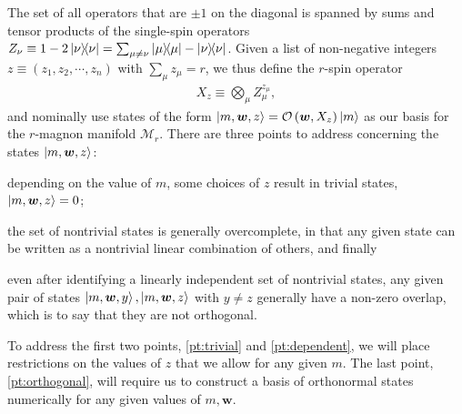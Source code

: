 \documentclass[nofootinbib,notitlepage,11pt]{revtex4-2}
\newcommand{\p}[1]{\left(#1\right)} %
\newcommand{\m}{\bm} %
\newcommand{\1}{\mathds{1}}
\newcommand{\M}{\mathcal{M}}
\renewcommand{\O}{\mathcal{O}}
\begin{document}
The set of all operators that are $\pm1$ on the diagonal is spanned by sums and tensor products of the single-spin operators $Z_\nu\equiv1-2\op\nu=\sum_{\mu\ne\nu}\op\mu-\op\nu$.
Given a list of non-negative integers $z\equiv\p{z_1,z_2,\cdots,z_n}$ with $\sum_\mu z_\mu=r$, we thus define the $r$-spin operator
\begin{align}
  X_z \equiv \bigotimes_\mu Z_\mu^{z_\mu},
\end{align}
and nominally use states of the form $\ket{m,\m w,z}=\O\p{\m w,X_z}\ket{m}$ as our basis for the $r$-magnon manifold $\M_r$.
There are three points to address concerning the states $\ket{m,\m w,z}$:
\begin{enumerate*}
\item \label{pt:trivial} depending on the value of $m$, some choices of $z$ result in trivial states, $\ket{m,\m w,z}=0$;
\item \label{pt:dependent} the set of nontrivial states is generally overcomplete, in that any given state can be written as a nontrivial linear combination of others, and finally
\item \label{pt:orthogonal} even after identifying a linearly independent set of nontrivial states, any given pair of states $\ket{m,\m w,y},\ket{m,\m w,z}$ with $y\ne z$ generally have a non-zero overlap, which is to say that they are not orthogonal.
\end{enumerate*}
To address the first two points, \ref{pt:trivial} and \ref{pt:dependent}, we will place restrictions on the values of $z$ that we allow for any given $m$.
The last point, \ref{pt:orthogonal}, will require us to construct a basis of orthonormal states numerically for any given values of $m,\m w$.
\end{document}
